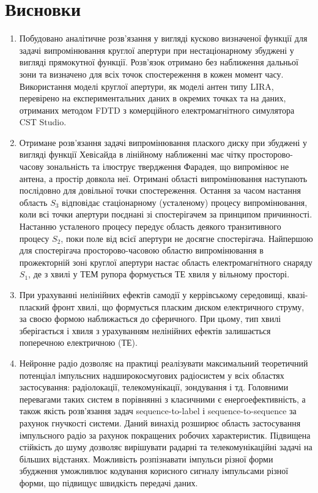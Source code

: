\chapter*{Висновки}

\begin{enumerate}

\item Побудовано аналітичне розв'язання у вигляді кусково визначеної функції для 
задачі випромінювання круглої апертури при нестаціонарному збуджені у вигляді 
прямокутної функції. Розв'язок отримано без наближення дальньої зони та визначено 
для всіх точок спостереження в кожен момент часу. Використання моделі круглої 
апертури, як моделі антен типу LIRA, перевірено на експериментальних даних в 
окремих точках та на даних, отриманих методом FDTD з комерційного 
електромагнітного симулятора CST Studio.

\item Отримане розв'язання задачі випромінювання плаского диску при збуджені у 
вигляді функції Хевісайда в лінійному наближенні має чітку просторово-часову 
зональність та ілюструє твердження Фарадея, що випромінює не антена, а простір 
довкола неї. Отримані області випромінювання наступають послідовно для довільної 
точки спостереження. Остання за часом настання область $ S_3 $ відповідає 
стаціонарному (усталеному) процесу випромінювання, коли всі точки апертури 
поєднані зі спостерігачем за принципом причинності. Настанню усталеного процесу 
передує область деякого транзитивного процесу $ S_2 $, поки поле від всієї 
апертури не досягне спостерігача. Найпершою для спостерігача просторово-часовою 
областю випромінювання в прожекторній зоні круглої апертури настає область 
електромагнітного снаряду $ S_1 $, де з хвилі у ТЕМ рупора формується ТЕ хвиля 
у вільному просторі.

\item При урахуванні нелінійних ефектів самодії у керрівському середовищі, 
квазі-плаский фронт хвилі, що формується пласким диском електричного струму, 
за своєю формою наближається до сферичного. При цьому, тип хвилі зберігається і
хвиля з урахуванням нелінійних ефектів залишається поперечною електричною (ТЕ). 

\item Нейронне радіо дозволяє на практиці реалізувати максимальний теоретичний
потенціал імпульсних надширокосмугових радіосистем у всіх областях застосування:
радіолокації, телекомунікації, зондування і тд. Головними перевагами таких систем 
в порівнянні з класичними є енергоефективність, а також якість розв'язання задач 
sequence-to-label і sequence-to-sequence за рахунок гнучкості системи.
Даний винахід розширює область застосування імпульсного радіо за 
рахунок покращених робочих характеристик. Підвищена стійкість до 
шуму дозволяє вирішувати радарні та телекомунікаційні задачі на 
більших відстанях. Можливість розпізнавати імпульси різної форми 
збудження уможливлює кодування корисного сигналу імпульсами різної форми, 
що підвищує швидкість передачі даних. 

\end{enumerate}
